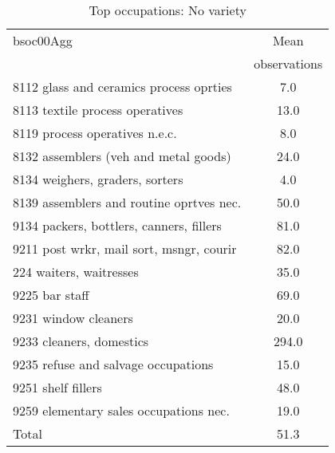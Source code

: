 \begin{table}
	\centering
	\caption{Top occupations: No variety}
	\begin{tabular}{lc}
	\toprule	
		
bsoc00Agg&Mean \\
&observations \\
\hline
8112 glass and ceramics process oprties&7.0 \\
8113 textile process operatives&13.0 \\
8119 process operatives n.e.c.&8.0 \\
8132 assemblers (veh and metal goods)&24.0 \\
8134 weighers, graders, sorters&4.0 \\
8139 assemblers and routine oprtves nec.&50.0 \\
9134 packers, bottlers, canners, fillers&81.0 \\
9211 post wrkr, mail sort, msngr, courir&82.0 \\
224 waiters, waitresses&35.0 \\
9225 bar staff&69.0 \\
9231 window cleaners&20.0 \\
9233 cleaners, domestics&294.0 \\
9235 refuse and salvage occupations&15.0 \\
9251 shelf fillers&48.0 \\
9259 elementary sales occupations nec.&19.0 \\
Total&51.3 \\
\bottomrule
\bottomrule
\end{tabular}
\end{table}
